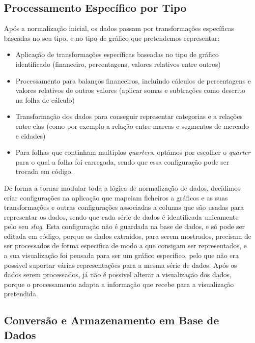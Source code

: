 \subsection{Processamento Específico por Tipo}

Após a normalização inicial, os dados passam por transformações específicas baseadas no seu tipo, e no tipo de gráfico que pretendemos representar:

\begin{itemize}
    \item Aplicação de transformações específicas baseadas no tipo de gráfico identificado (financeiro, percentagens, valores relativos entre outros)
    \item Processamento para balanços financeiros, incluindo cálculos de percentagens e valores relativos de outros valores (aplicar somas e subtrações como descrito na folha de cálculo)
    \item Transformação dos dados para conseguir representar categorias e a relações entre elas (como por exemplo a relação entre marcas e segmentos de mercado e cidades)
    \item Para folhas que continham multiplos \textit{quarters}, optámos por escolher o \textit{quarter} para o qual a folha foi carregada, sendo que essa configuração pode ser trocada em código.
\end{itemize}

De forma a tornar modular toda a lógica de normalização de dados, decidimos criar configurações na aplicação que mapeiam ficheiros a gráficos e as suas transformações e outras configurações associadas a colunas que são usadas para representar os dados, sendo que cada série de dados é identificada unicamente pelo seu \textit{slug}. Esta configuração não é guardada na base de dados, e só pode ser editada em código, porque os dados extraidos, para serem mostrados, precisam de ser processados de forma especifica de modo a que consigam ser representados, e a sua visualização foi pensada para ser um gráfico especifico, pelo que não era possivel suportar várias representações para a mesma série de dados. Após os dados serem processados, já não é possivel alterar a visualização dos dados, porque o processamento adapta a informação que recebe para a visualização pretendida.

\subsection{Conversão e Armazenamento em Base de Dados}
\label{sec:armazenamentoDados}

